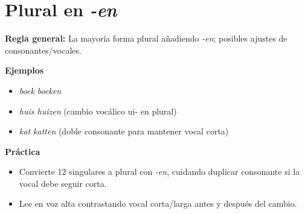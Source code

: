 \section{Plural en \textit{-en}}
\textbf{Regla general:} La mayoría forma plural añadiendo \textit{-en}; posibles ajustes de consonantes/vocales.

\textbf{Ejemplos}
\begin{itemize}[leftmargin=*]
  \item \textit{boek \textrightarrow{} boeken}
  \item \textit{huis \textrightarrow{} huizen} (cambio vocálico ui- en plural)
  \item \textit{kat \textrightarrow{} katten} (doble consonante para mantener vocal corta)
\end{itemize}

\textbf{Práctica}
\begin{itemize}[leftmargin=*]
  \item Convierte 12 singulares a plural con \textit{-en}, cuidando duplicar consonante si la vocal debe seguir corta.
  \item Lee en voz alta contrastando vocal corta/larga antes y después del cambio.
\end{itemize}

